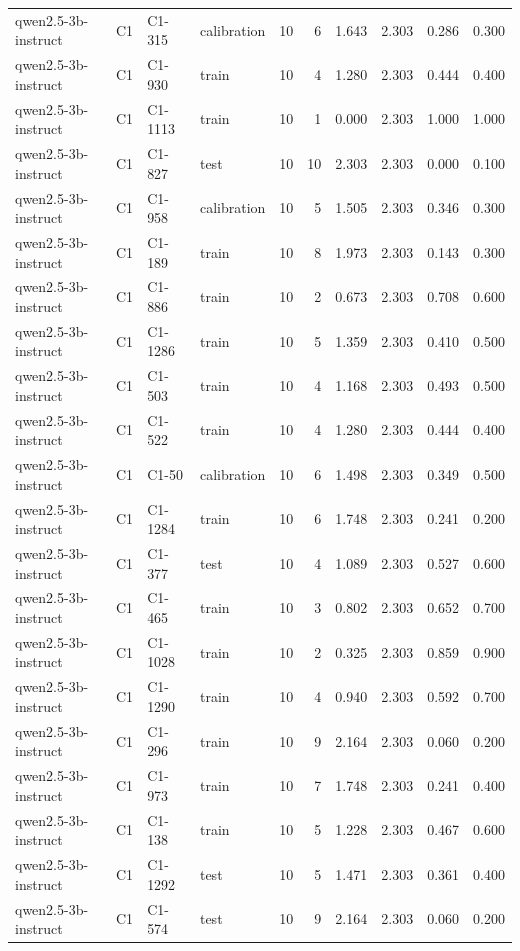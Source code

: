 \begin{table}
\begin{tabular}{llllrrrrrr}
qwen2.5-3b-instruct & C1 & C1-315 & calibration & 10 & 6 & 1.643 & 2.303 & 0.286 & 0.300 \\
qwen2.5-3b-instruct & C1 & C1-930 & train & 10 & 4 & 1.280 & 2.303 & 0.444 & 0.400 \\
qwen2.5-3b-instruct & C1 & C1-1113 & train & 10 & 1 & 0.000 & 2.303 & 1.000 & 1.000 \\
qwen2.5-3b-instruct & C1 & C1-827 & test & 10 & 10 & 2.303 & 2.303 & 0.000 & 0.100 \\
qwen2.5-3b-instruct & C1 & C1-958 & calibration & 10 & 5 & 1.505 & 2.303 & 0.346 & 0.300 \\
qwen2.5-3b-instruct & C1 & C1-189 & train & 10 & 8 & 1.973 & 2.303 & 0.143 & 0.300 \\
qwen2.5-3b-instruct & C1 & C1-886 & train & 10 & 2 & 0.673 & 2.303 & 0.708 & 0.600 \\
qwen2.5-3b-instruct & C1 & C1-1286 & train & 10 & 5 & 1.359 & 2.303 & 0.410 & 0.500 \\
qwen2.5-3b-instruct & C1 & C1-503 & train & 10 & 4 & 1.168 & 2.303 & 0.493 & 0.500 \\
qwen2.5-3b-instruct & C1 & C1-522 & train & 10 & 4 & 1.280 & 2.303 & 0.444 & 0.400 \\
qwen2.5-3b-instruct & C1 & C1-50 & calibration & 10 & 6 & 1.498 & 2.303 & 0.349 & 0.500 \\
qwen2.5-3b-instruct & C1 & C1-1284 & train & 10 & 6 & 1.748 & 2.303 & 0.241 & 0.200 \\
qwen2.5-3b-instruct & C1 & C1-377 & test & 10 & 4 & 1.089 & 2.303 & 0.527 & 0.600 \\
qwen2.5-3b-instruct & C1 & C1-465 & train & 10 & 3 & 0.802 & 2.303 & 0.652 & 0.700 \\
qwen2.5-3b-instruct & C1 & C1-1028 & train & 10 & 2 & 0.325 & 2.303 & 0.859 & 0.900 \\
qwen2.5-3b-instruct & C1 & C1-1290 & train & 10 & 4 & 0.940 & 2.303 & 0.592 & 0.700 \\
qwen2.5-3b-instruct & C1 & C1-296 & train & 10 & 9 & 2.164 & 2.303 & 0.060 & 0.200 \\
qwen2.5-3b-instruct & C1 & C1-973 & train & 10 & 7 & 1.748 & 2.303 & 0.241 & 0.400 \\
qwen2.5-3b-instruct & C1 & C1-138 & train & 10 & 5 & 1.228 & 2.303 & 0.467 & 0.600 \\
qwen2.5-3b-instruct & C1 & C1-1292 & test & 10 & 5 & 1.471 & 2.303 & 0.361 & 0.400 \\
qwen2.5-3b-instruct & C1 & C1-574 & test & 10 & 9 & 2.164 & 2.303 & 0.060 & 0.200 \\

\end{tabular}
\end{table}
